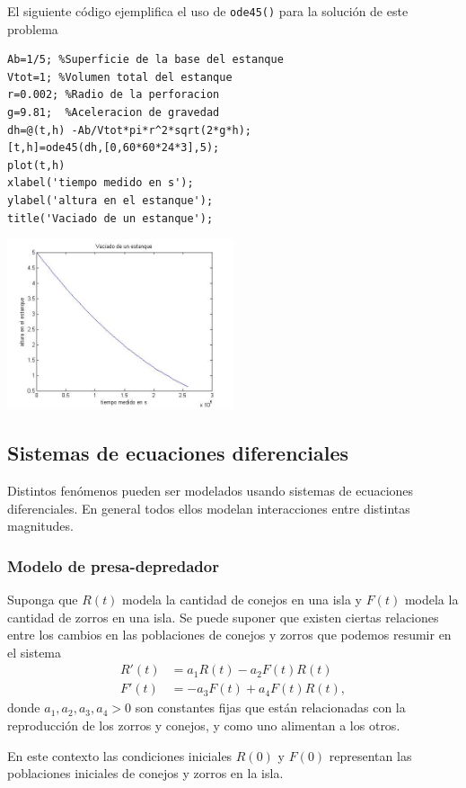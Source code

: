 \documentclass[11pt]{article}
\begin{document}
El siguiente c\'odigo ejemplifica el uso de \texttt{ode45()} para la soluci\'on de este problema
\begin{lstlisting}
Ab=1/5; %Superficie de la base del estanque
Vtot=1; %Volumen total del estanque
r=0.002; %Radio de la perforacion
g=9.81;  %Aceleracion de gravedad
dh=@(t,h) -Ab/Vtot*pi*r^2*sqrt(2*g*h);
[t,h]=ode45(dh,[0,60*60*24*3],5);
plot(t,h)
xlabel('tiempo medido en s');
ylabel('altura en el estanque');
title('Vaciado de un estanque');
\end{lstlisting}
\begin{center}
\includegraphics[width=0.5\textwidth]{eje3.jpg}
\end{center}

\subsection{Sistemas de ecuaciones diferenciales}
Distintos fen\'omenos pueden ser modelados usando sistemas de ecuaciones diferenciales. En general todos ellos modelan interacciones entre distintas magnitudes.

\subsubsection{Modelo de presa-depredador}
Suponga que $R(t)$ modela la cantidad de conejos en una isla y $F(t)$ modela la cantidad de zorros en una isla. Se puede suponer que existen ciertas relaciones entre los cambios en las poblaciones de conejos y zorros que podemos resumir en el sistema
$$
\begin{array}{cl}
R'(t)	&= a_1 R(t)- a_2 F(t)R(t) \\
F'(t)	&=-a_3 F(t)+ a_4 F(t)R(t),
\end{array}
$$
donde $a_1,a_2,a_3,a_4>0$ son constantes fijas que están relacionadas con la reproducci\'on de los zorros y conejos, y como uno alimentan a los otros.

En este contexto las condiciones iniciales $R(0)$ y $F(0)$ representan las poblaciones iniciales de conejos y zorros en la isla.
\end{document}
